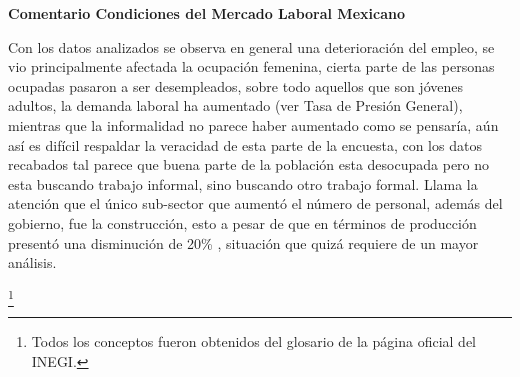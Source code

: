 \textbf{Comentario Condiciones del Mercado Laboral Mexicano}

Con los datos analizados se observa en general una deterioración del empleo, se vio principalmente afectada la ocupación femenina, cierta parte de las personas ocupadas pasaron a ser desempleados, sobre todo aquellos que son jóvenes adultos, la demanda laboral ha aumentado (ver Tasa de Presión General), mientras que la informalidad no parece haber aumentado como se pensaría, aún así es difícil respaldar la veracidad de esta parte de la encuesta, con los datos recabados tal parece que buena parte de la población esta desocupada pero no esta buscando trabajo informal, sino buscando otro trabajo formal. Llama la atención que el único sub-sector que aumentó el número de personal, además del gobierno, fue la construcción, esto a pesar de que en términos de producción presentó una disminución de 20\% \cite{ConstruccionINEGI}, situación que quizá requiere de un mayor análisis.

\footnote{Todos los conceptos fueron obtenidos del glosario de la página oficial del INEGI.} \cite{ENOE2020} \cite{GlosarioINEGI}